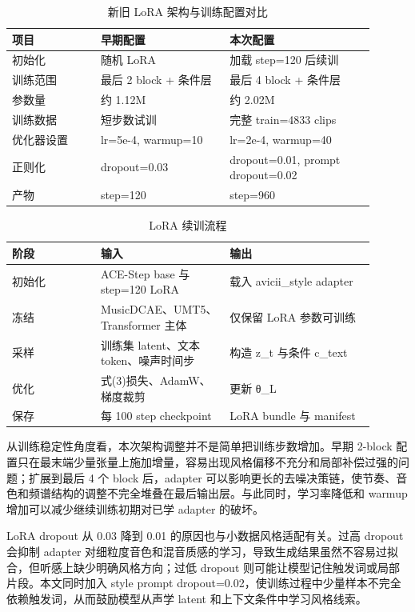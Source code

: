 \documentclass[UTF8,a4paper,zihao=-4,fontset=none]{ctexart}
\begin{document}
\begin{table}[H]
\centering
\caption{新旧 LoRA 架构与训练配置对比}
\small
\begin{tabular}{p{0.22\linewidth}p{0.32\linewidth}p{0.36\linewidth}}
\toprule
项目 & 早期配置 & 本次配置 \\
\midrule
初始化 & 随机 LoRA & 加载 step=120 后续训 \\
训练范围 & 最后 2 block + 条件层 & 最后 4 block + 条件层 \\
参数量 & 约 1.12M & 约 2.02M \\
训练数据 & 短步数试训 & 完整 train=4833 clips \\
优化器设置 & lr=5e-4, warmup=10 & lr=2e-4, warmup=40 \\
正则化 & dropout=0.03 & dropout=0.01, prompt dropout=0.02 \\
产物 & step=120 & step=960 \\
\bottomrule
\end{tabular}
\end{table}
\begin{table}[H]
\centering
\caption{LoRA 续训流程}
\small
\begin{tabular}{p{0.22\linewidth}p{0.32\linewidth}p{0.36\linewidth}}
\toprule
阶段 & 输入 & 输出 \\
\midrule
初始化 & ACE-Step base 与 step=120 LoRA & 载入 avicii\_style adapter \\
冻结 & MusicDCAE、UMT5、Transformer 主体 & 仅保留 LoRA 参数可训练 \\
采样 & 训练集 latent、文本 token、噪声时间步 & 构造 z\_t 与条件 c\_text \\
优化 & 式(3)损失、AdamW、梯度裁剪 & 更新 θ\_L \\
保存 & 每 100 step checkpoint & LoRA bundle 与 manifest \\
\bottomrule
\end{tabular}
\end{table}
从训练稳定性角度看，本次架构调整并不是简单把训练步数增加。早期 2-block 配置只在最末端少量张量上施加增量，容易出现风格偏移不充分和局部补偿过强的问题；扩展到最后 4 个 block 后，adapter 可以影响更长的去噪决策链，使节奏、音色和频谱结构的调整不完全堆叠在最后输出层。与此同时，学习率降低和 warmup 增加可以减少继续训练初期对已学 adapter 的破坏。

LoRA dropout 从 0.03 降到 0.01 的原因也与小数据风格适配有关。过高 dropout 会抑制 adapter 对细粒度音色和混音质感的学习，导致生成结果虽然不容易过拟合，但听感上缺少明确风格方向；过低 dropout 则可能让模型记住触发词或局部片段。本文同时加入 style prompt dropout=0.02，使训练过程中少量样本不完全依赖触发词，从而鼓励模型从声学 latent 和上下文条件中学习风格线索。
\end{document}
